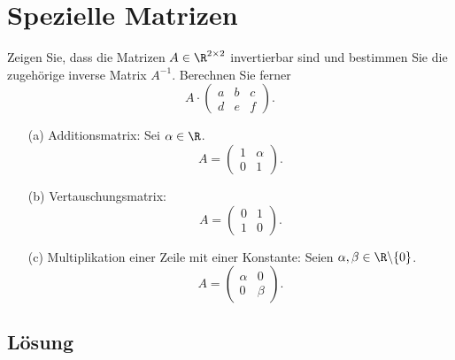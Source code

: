 \newpage
\section{Spezielle Matrizen}

Zeigen Sie, dass die Matrizen $A\in \R^{2\times 2}$ invertierbar sind und bestimmen Sie die zugeh\"orige inverse Matrix $A^{-1}$.
Berechnen Sie ferner
		$$
			A
			\cdot
			\begin{pmatrix}
				a & b & c\\
				d & e  & f
			\end{pmatrix}.
		$$
\begin{itemize}
	\item[(a)] Additionsmatrix:	
		Sei $\alpha \in \R$. 
		$$
			A
			=
			\begin{pmatrix}
				1 & \alpha\\
				0 & 1
			\end{pmatrix}.
		$$

	\item[(b)] Vertauschungsmatrix:
		$$
			A
			=
			\begin{pmatrix}
				0 & 1\\
				1 & 0
			\end{pmatrix}.
		$$

	\item[(c)] Multiplikation einer Zeile mit einer Konstante:
		Seien $\alpha, \beta \in \R\backslash\{0\}$. 
		$$
			A
			=
			\begin{pmatrix}
				\alpha 	& 0\\
				0 		& \beta
			\end{pmatrix}.
		$$
\end{itemize}

\subsection*{L\"osung}

